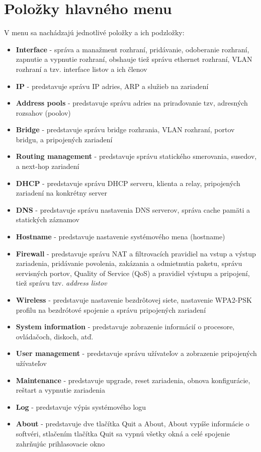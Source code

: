 \section{Položky hlavného menu}
V menu sa nachádzajú jednotlivé položky a ich podzložky:
\begin{itemize}
\item \textbf{Interface} - správa a manažment rozhraní, pridávanie, odoberanie rozhraní, zapnutie a vypnutie rozhraní, obshauje tiež správu ethernet rozhraní, VLAN rozhraní a tzv. interface listov a ich členov
\item \textbf{IP} - predstavuje správu IP adries, ARP a služieb na zariadení
\item \textbf{Address pools} - predstavuje správu adries na priraďovanie tzv, adresných rozsahov (poolov)
\item \textbf{Bridge} - predstavuje správu bridge rozhrania, VLAN rozhraní, portov bridgu, a pripojených zariadení
\item \textbf{Routing management} - predstavuje správu statického smerovania, susedov, a next-hop zariadení
\item \textbf{DHCP} - predstavuje správu DHCP serveru, klienta a relay, pripojených zariadení na konkrétny server
\item \textbf{DNS} - predstavuje správu nastavenia DNS serverov, správa cache pamäti a statických záznamov
\item \textbf{Hostname} - predstavuje nastavenie systémového mena (hostname)
\item \textbf{Firewall} - predstavuje správu NAT a filtrovacích pravidiel na vstup a výstup zariadenia, pridávanie povolenia, zakázania  a odmietnutia paketu, správu servisných portov, Quality of Service (QoS) a pravidiel výstupu a pripojení, tiež správu tzv. \textit{address listov}
\item \textbf{Wireless} - predstavuje nastavenie bezdrôtovej siete, nastavenie WPA2-PSK profilu na bezdrótové spojenie  a správu pripojených zariadení
\item  \textbf{System information} - predstavuje zobrazenie informácií o procesore,  ovládačoch, diskoch, atď.
\item \textbf{User management} - predstavuje správu užívateľov a zobrazenie pripojených užívateľov
\item \textbf{Maintenance} - predstavuje upgrade, reset zariadenia, obnova konfigurácie, reštart a vypnutie zariadenia
\item \textbf{Log} - predstavuje výpis systémového logu
\item \textbf{About} - predstavuje dve tlačítka Quit a About, About vypíše informácie o softvéri, stlačením tlačítka  Quit sa vypnú všetky okná a celé spojenie zahrňujúc prihlasovacie okno 
\end{itemize}

